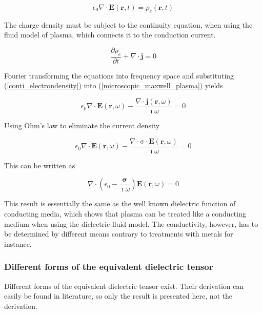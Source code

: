 \documentclass[a4paper,11pt]{article}
\begin{document}
\begin{equation}\label{microscopic_maxwell_plasma}
    \epsilon_0 \nabla \cdot \mathbf{E}(\mathbf{r},t)=\rho_e(\mathbf{r},t)
\end{equation}

The charge density must be subject to the continuity equation, when using the fluid model of plasma, which connects it to the conduction current.

\begin{equation}\label{conti_electrondensity}
    \frac{\partial \rho_e}{\partial t} + \nabla \cdot \mathbf{j}=0
\end{equation}

Fourier transforming the equations into frequency space and substituting (\ref{conti_electrondensity}) into (\ref{microscopic_maxwell_plasma}) yields

\begin{equation}
    \epsilon_0  \nabla \cdot \mathbf{E}(\mathbf{r},\omega)-\frac{\nabla \cdot \mathbf{j}(\mathbf{r},\omega)}{\imath \omega}=0
\end{equation}

Using Ohm's law to eliminate the current density

\begin{equation}
    \epsilon_0  \nabla \cdot \mathbf{E}(\mathbf{r},\omega)-\frac{\nabla \cdot \mathrm{\sigma } \cdot \mathbf{E}(\mathbf{r},\omega)}{\imath \omega}=0
\end{equation}

This can be written as

\begin{equation}
    \nabla \cdot \left( \epsilon_0 -\frac{\mathbf{\sigma } }{\imath \omega}  \right) \mathbf{E}(\mathbf{r},\omega)=0
\end{equation}

This result is essentially the same as the well known dielectric function of conducting media, which shows that plasma can be treated like a conducting medium when using the dielectric fluid model. The conductivity, however, has to be determined by different means contrary to treatments with metals for instance.

\subsubsection{Different forms of the equivalent dielectric tensor}
Different forms of the equivalent dielectric tensor exist. Their derivation can easily be found in literature, so only the result is presented here, not the derivation.\\
\end{document}
